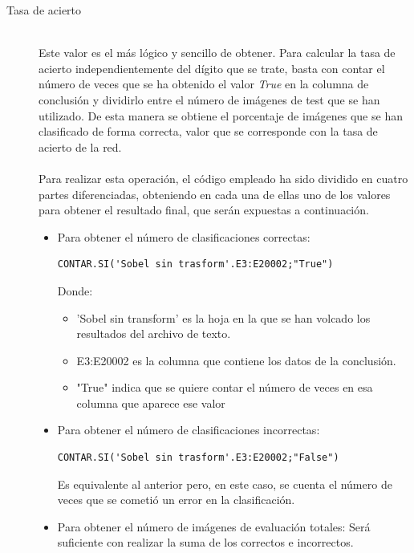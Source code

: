 \begin{description}
	\item[Tasa de acierto] \hfill 
	\vspace{5pt}
	\\
	Este valor es el más lógico y sencillo de obtener. Para calcular la tasa de acierto independientemente del dígito que se trate, basta con contar el número de veces que se ha obtenido el valor \textit{True} en la columna de conclusión y dividirlo entre el número de imágenes de test que se han utilizado. De esta manera se obtiene el porcentaje de imágenes que se han clasificado de forma correcta, valor que se corresponde con la tasa de acierto de la red.\\
	\vspace{-10pt}
	\\
	Para realizar esta operación, el código empleado ha sido dividido en cuatro partes diferenciadas, obteniendo en cada una de ellas uno de los valores para obtener el resultado final, que serán expuestas a continuación.\\
	\vspace{10pt}
	\begin{itemize}
		\item{Para obtener el número de clasificaciones correctas:
		\vspace{10pt}
		\begin{lstlisting}[frame=single]
	CONTAR.SI('Sobel sin trasform'.E3:E20002;"True")
		\end{lstlisting}
		Donde:
		\begin{itemize}
			\item 'Sobel sin transform' es la hoja en la que se han volcado los resultados del archivo de texto.
			\item E3:E20002 es la columna que contiene los datos de la conclusión.
			\item "True" indica que se quiere contar el número de veces en esa columna que aparece ese valor
		\end{itemize}
	}
	\item{Para obtener el número de clasificaciones incorrectas:
		\vspace{10pt}
		\begin{lstlisting}[frame=single]
	CONTAR.SI('Sobel sin trasform'.E3:E20002;"False")
		\end{lstlisting}
		Es equivalente al anterior pero, en este caso, se cuenta el número de veces que se cometió un error en la clasificación.
	}
	\item{Para obtener el número de imágenes de evaluación totales: Será suficiente con realizar la suma de los correctos e incorrectos.
}
\end{itemize}
\end{description}
